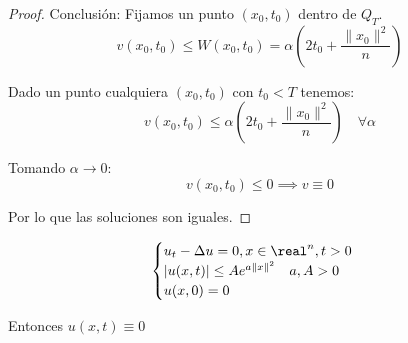 \begin{proof}
				\begin{minipage}[m]{\textwidth}
				\end{minipage}

				Conclusión: Fijamos un punto $(x_0,t_0)$ dentro de $Q_T$.
					\[v(x_0,t_0) \leq W(x_0,t_0) = \alpha (2t_0+ \frac{\|x_0\|^2}{n})\]

				Dado un punto cualquiera $(x_0,t_0)$ con $t_0 < T$ tenemos:
				\[ v(x_0,t_0) \leq \alpha \left(2 t_0 + \frac{\|x_0\|^2}{n} \right) \quad \forall \alpha\]

				Tomando $\alpha \rightarrow 0$:
				\[v(x_0,t_0) \leq 0 \implies v \equiv 0\]

				Por lo que las soluciones son iguales.

			\end{proof}

			\begin{theorem}
				\[\begin{cases}
					u_t - \Delta u = 0, x \in \real^n, t>0 \\
					|u(x,t)| \leq A e^{a \|x\|^2} \quad a,A > 0 \\
					u(x,0) = 0
				\end{cases}\]

				Entonces $u(x,t) \equiv 0$

			\end{theorem}

